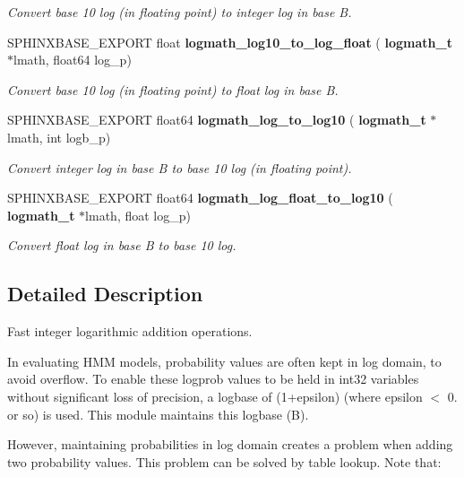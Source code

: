 \begin{DoxyCompactItemize}
\begin{DoxyCompactList}\small\item\em Convert base 10 log (in floating point) to integer log in base B. \end{DoxyCompactList}\item 
\mbox{\label{logmath_8h_a319ff7b55b6fca55e432ac8e85c368db}} 
S\+P\+H\+I\+N\+X\+B\+A\+S\+E\+\_\+\+E\+X\+P\+O\+RT float \textbf{ logmath\+\_\+log10\+\_\+to\+\_\+log\+\_\+float} (\textbf{ logmath\+\_\+t} $\ast$lmath, float64 log\+\_\+p)
\begin{DoxyCompactList}\small\item\em Convert base 10 log (in floating point) to float log in base B. \end{DoxyCompactList}\item 
\mbox{\label{logmath_8h_a7c17cb624003975e84fbd141ca6e2e06}} 
S\+P\+H\+I\+N\+X\+B\+A\+S\+E\+\_\+\+E\+X\+P\+O\+RT float64 \textbf{ logmath\+\_\+log\+\_\+to\+\_\+log10} (\textbf{ logmath\+\_\+t} $\ast$lmath, int logb\+\_\+p)
\begin{DoxyCompactList}\small\item\em Convert integer log in base B to base 10 log (in floating point). \end{DoxyCompactList}\item 
\mbox{\label{logmath_8h_a32491ca5b2688fb633d85ab866dcf858}} 
S\+P\+H\+I\+N\+X\+B\+A\+S\+E\+\_\+\+E\+X\+P\+O\+RT float64 \textbf{ logmath\+\_\+log\+\_\+float\+\_\+to\+\_\+log10} (\textbf{ logmath\+\_\+t} $\ast$lmath, float log\+\_\+p)
\begin{DoxyCompactList}\small\item\em Convert float log in base B to base 10 log. \end{DoxyCompactList}\end{DoxyCompactItemize}


\subsection{Detailed Description}
Fast integer logarithmic addition operations. 

In evaluating H\+MM models, probability values are often kept in log domain, to avoid overflow. To enable these logprob values to be held in int32 variables without significant loss of precision, a logbase of (1+epsilon) (where epsilon $<$ 0. or so) is used. This module maintains this logbase (B).

However, maintaining probabilities in log domain creates a problem when adding two probability values. This problem can be solved by table lookup. Note that\+:


